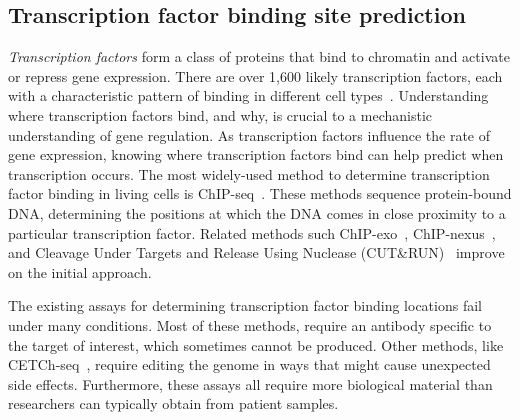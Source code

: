 \documentclass[5p]{elsarticle}
\newcommand{\rev}[1]{{\color{black}#1}}
\begin{document}
\subsection{Transcription factor binding site prediction}
\emph{Transcription factors} form a class of proteins that bind to chromatin and activate or repress gene expression.
There are over 1,600 likely transcription factors, each with a characteristic pattern of binding in different cell types~\cite{Vaquerizas2009AEvolution,Lambert2018TheFactors}.
Understanding where transcription factors bind, and why, is crucial to a mechanistic understanding of gene regulation.
As transcription factors influence the rate of gene expression, knowing where transcription factors bind can help predict when transcription occurs.
The most widely-used method to determine transcription factor binding in living cells is ChIP-seq~\cite{Johnson2007Genome-wideInteractions}.
The\-se methods sequence protein-bound DNA, determining the positions at which the DNA comes in close proximity to a particular transcription factor.
Related methods such ChIP-exo~\cite{Rhee2012ChIP-exoAccuracy}, ChIP-nexus~\cite{He2015ChIP-nexusFootprints}, and Cleavage Under Targets and Release Using Nuclease (CUT\&RUN)~\cite{Skene2017AnSites} improve on the initial approach.

The existing assays for determining transcription factor binding locations fail under many conditions.
Most of these methods, require an antibody specific to the target of interest, which sometimes cannot be produced.
Other methods, like CETCh-seq~\cite{Savic2015CETCh-seq:Proteins}, require editing the genome in ways that might cause unexpected side effects.
Furthermore, these assays all require more biological material than researchers \rev{can typically obtain from patient samples.}
\end{document}
